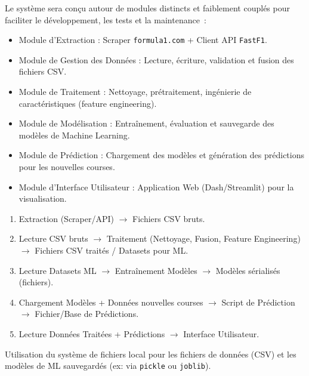\documentclass[11pt, a4paper]{article}
\begin{document}
\begin{description}[style=standard, itemsep=0.5em, labelwidth=!, leftmargin=1.5em, font=\normalfont]
    \item[Architecture Modulaire~:] Le système sera conçu autour de modules distincts et faiblement couplés pour faciliter le développement, les tests et la maintenance~:
        \begin{itemize}[label=\textbullet, itemsep=0.2em, leftmargin=*]
            \item Module d'Extraction : Scraper \texttt{formula1.com} + Client API \texttt{FastF1}.
            \item Module de Gestion des Données : Lecture, écriture, validation et fusion des fichiers CSV.
            \item Module de Traitement : Nettoyage, prétraitement, ingénierie de caractéristiques (feature engineering).
            \item Module de Modélisation : Entraînement, évaluation et sauvegarde des modèles de Machine Learning.
            \item Module de Prédiction : Chargement des modèles et génération des prédictions pour les nouvelles courses.
            \item Module d'Interface Utilisateur : Application Web (Dash/Streamlit) pour la visualisation.
        \end{itemize}
    \item[Flux de Données Principal~:]
        \begin{enumerate}[label=(\alph*), itemsep=0.2em, leftmargin=*]
            \item Extraction (Scraper/API) $\rightarrow$ Fichiers CSV bruts.
            \item Lecture CSV bruts $\rightarrow$ Traitement (Nettoyage, Fusion, Feature Engineering) $\rightarrow$ Fichiers CSV traités / Datasets pour ML.
            \item Lecture Datasets ML $\rightarrow$ Entraînement Modèles $\rightarrow$ Modèles sérialisés (fichiers).
            \item Chargement Modèles + Données nouvelles courses $\rightarrow$ Script de Prédiction $\rightarrow$ Fichier/Base de Prédictions.
            \item Lecture Données Traitées + Prédictions $\rightarrow$ Interface Utilisateur.
        \end{enumerate}
    \item[Stockage~:] Utilisation du système de fichiers local pour les fichiers de données (CSV) et les modèles de ML sauvegardés (ex: via \texttt{pickle} ou \texttt{joblib}).

\end{description}
\end{document}
